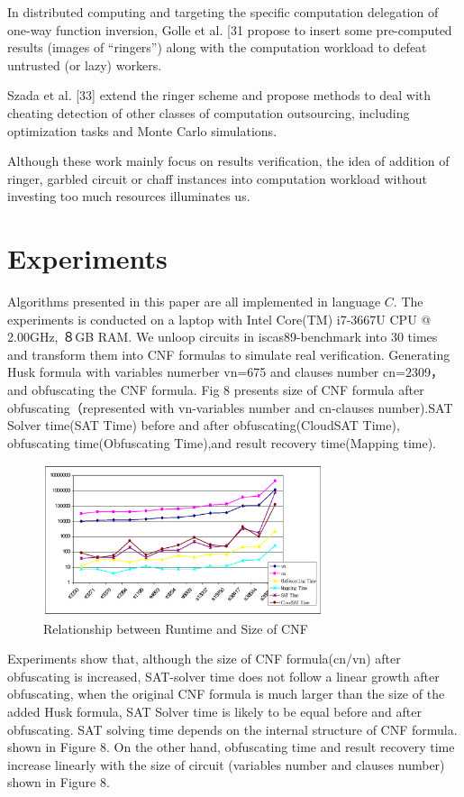 \documentclass[runningheads,a4paper]{llncs}
\begin{document}
In distributed computing and targeting the specific computation delegation of one-way function inversion, Golle et al. [31 propose to insert some pre-computed results (images of “ringers”) along with the computation workload to defeat untrusted (or lazy) workers. 

Szada et al. [33] extend the ringer scheme and propose methods to deal with cheating detection of other classes of computation outsourcing, including optimization tasks and Monte Carlo simulations.

Although these work mainly focus on results verification, the idea of addition of ringer, garbled circuit or chaff instances into computation workload without investing too much resources illuminates us.
\section{Experiments} 

Algorithms presented in this paper are all implemented in language $C$.
The experiments is conducted on a laptop with Intel Core(TM) i7-3667U CPU @ 2.00GHz, ８GB RAM. 
We unloop circuits in iscas89-benchmark into 30 times and transform them into CNF formulas to simulate real verification.
Generating Husk formula with variables numerber vn=675 and clauses number cn=2309，and obfuscating the CNF formula. 
Fig 8 presents size of CNF formula after obfuscating（represented with vn-variables number and cn-clauses number).SAT Solver time(SAT Time) before and after obfuscating(CloudSAT Time),
obfuscating time(Obfuscating Time),and result recovery time(Mapping time).


\begin{figure}
\centering
\includegraphics[width=8.2cm]{p1}
\caption{Relationship between Runtime and Size of CNF }
\end{figure}

Experiments show that, although the size of CNF formula(cn/vn) after obfuscating is increased,
SAT-solver time does not follow a linear growth after obfuscating, when the original CNF formula is much larger than the size of the added Husk formula,
SAT Solver time is likely to be equal before and after obfuscating. SAT solving time depends on the internal structure of CNF formula. shown in Figure 8.
On the other hand, obfuscating time and result recovery time increase linearly with the size of circuit (variables number and clauses number) shown in Figure 8.
\end{document}
